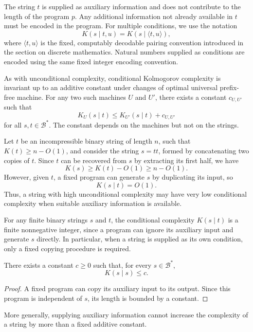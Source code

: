 The string $t$ is supplied as auxiliary information and does not contribute to the length of the program $p$. Any additional information not already available in $t$ must be encoded in the program. For multiple conditions, we use the notation
\[
K(s \mid t,u) = K(s \mid \langle t,u\rangle),
\]
where $\langle t,u\rangle$ is the fixed, computably decodable pairing convention introduced in the section on discrete mathematics. Natural numbers supplied as conditions are encoded using the same fixed integer encoding convention.

As with unconditional complexity, conditional Kolmogorov complexity is invariant up to an additive constant under changes of optimal universal prefix-free machine. For any two such machines $U$ and $U'$, there exists a constant $c_{U,U'}$ such that
\[
K_U(s \mid t) \leq K_{U'}(s \mid t) + c_{U,U'}
\]
for all $s,t \in \mathcal{B}^*$. The constant depends on the machines but not on the strings.

\begin{example}
Let $t$ be an incompressible binary string of length $n$, such that $K(t) \geq n-O(1)$, and consider the string $s=tt$, formed by concatenating two copies of $t$. Since $t$ can be recovered from $s$ by extracting its first half, we have
\[
K(s) \geq K(t)-O(1) \geq n-O(1).
\]
However, given $t$, a fixed program can generate $s$ by duplicating its input, so
\[
K(s \mid t)=O(1).
\]
Thus, a string with high unconditional complexity may have very low conditional complexity when suitable auxiliary information is available.
\end{example}

For any finite binary strings $s$ and $t$, the conditional complexity $K(s \mid t)$ is a finite nonnegative integer, since a program can ignore its auxiliary input and generate $s$ directly. In particular, when a string is supplied as its own condition, only a fixed copying procedure is required.

\begin{proposition}
\label{prop:self_conditional}
There exists a constant $c\geq 0$ such that, for every $s \in \mathcal{B}^*$,
\[
K(s \mid s) \leq c.
\]
\end{proposition}
\begin{proof}
A fixed program can copy its auxiliary input to its output. Since this program is independent of $s$, its length is bounded by a constant.
\end{proof}

More generally, supplying auxiliary information cannot increase the complexity of a string by more than a fixed additive constant.

